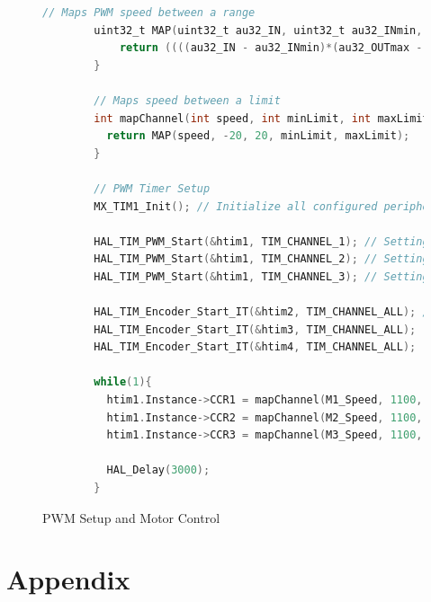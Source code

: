 \documentclass{report}
\begin{document}
    \begin{figure}
      \begin{lstlisting}[language=C]
        // Maps PWM speed between a range
        uint32_t MAP(uint32_t au32_IN, uint32_t au32_INmin, uint32_t au32_INmax, uint32_t au32_OUTmin, uint32_t au32_OUTmax){
            return ((((au32_IN - au32_INmin)*(au32_OUTmax - au32_OUTmin))/(au32_INmax - au32_INmin)) + au32_OUTmin);
        }
        
        // Maps speed between a limit
        int mapChannel(int speed, int minLimit, int maxLimit){
          return MAP(speed, -20, 20, minLimit, maxLimit);
        }

        // PWM Timer Setup
        MX_TIM1_Init(); // Initialize all configured peripherals

        HAL_TIM_PWM_Start(&htim1, TIM_CHANNEL_1); // Setting up PWM Timer
        HAL_TIM_PWM_Start(&htim1, TIM_CHANNEL_2); // Setting up PWM Timer
        HAL_TIM_PWM_Start(&htim1, TIM_CHANNEL_3); // Setting up PWM Timer

        HAL_TIM_Encoder_Start_IT(&htim2, TIM_CHANNEL_ALL); // Setting up Encoders
        HAL_TIM_Encoder_Start_IT(&htim3, TIM_CHANNEL_ALL);
        HAL_TIM_Encoder_Start_IT(&htim4, TIM_CHANNEL_ALL);

        while(1){
          htim1.Instance->CCR1 = mapChannel(M1_Speed, 1100, 1884); // current, minimum, maximum, default
          htim1.Instance->CCR2 = mapChannel(M2_Speed, 1100, 1884);
          htim1.Instance->CCR3 = mapChannel(M3_Speed, 1100, 1884);

          HAL_Delay(3000);
        }

	    \end{lstlisting}
     \caption{PWM Setup and Motor Control}
     \label{fig:PWM}
    \end{figure}


    \appendix

    \chapter{Appendix}
\end{document}
